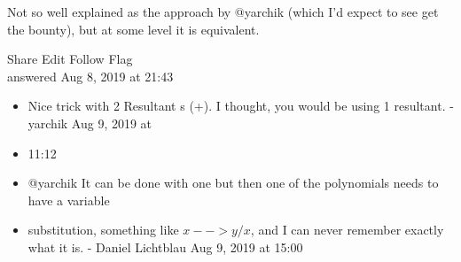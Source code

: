 \documentclass[10pt]{article}
\begin{document}
Not so well explained as the approach by @yarchik (which I'd expect to see get the bounty), but at some level it is equivalent.

Share Edit Follow Flag\\
answered Aug 8, 2019 at 21:43

\begin{itemize}
  \item[◯] Nice trick with 2 Resultant s (+). I thought, you would be using 1 resultant. - yarchik Aug 9, 2019 at
  \item[◯] 11:12
  \item[◯] @yarchik It can be done with one but then one of the polynomials needs to have a variable
  \item[◯] substitution, something like $x-->y / x$, and I can never remember exactly what it is. - Daniel Lichtblau Aug 9, 2019 at 15:00
\end{itemize}
\end{document}
